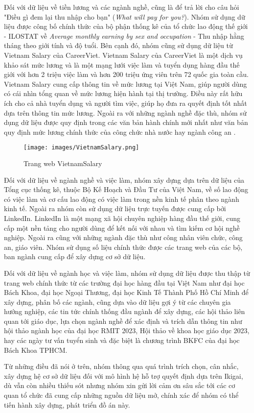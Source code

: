 Đối với dữ liệu về tiền lương và các ngành nghề, cũng là để trả lời cho câu hỏi "Điều gì đem lại thu nhập cho bạn" (\textit{What will pay for you?}). Nhóm sử dụng dữ liệu được công bố chính thức của bộ phận thống kê của tổ chức lao động thế giới - ILOSTAT về \textit{Average monthly earning by sex and occupation} - Thu nhập hằng tháng theo giới tính và độ tuổi. Bên cạnh đó, nhóm cũng sử dụng dữ liệu từ Vietnam Salary của CareerViet. Vietnam Salary của CareerViet là một dịch vụ khảo sát mức lương và là một mạng lưới việc làm và tuyển dụng hàng đầu thế giới với hơn 2 triệu việc làm và hơn 200 triệu ứng viên trên 72 quốc gia toàn cầu. Vietnam Salary cung cấp thông tin về mức lương tại Việt Nam, giúp người dùng có cái nhìn tổng quan về mức lương hiện hành tại thị trường. Điều này rất hữu ích cho cả nhà tuyển dụng và người tìm việc, giúp họ đưa ra quyết định tốt nhất dựa trên thông tin mức lương. Ngoài ra với những ngành nghề đặc thù, nhóm sử dụng dữ liệu được quy định trong các văn bản hành chính mới nhất như văn bản quy định mức lương chính thức của công chức nhà nước hay ngành công an \cite{thuvienphapluat} \cite{tuoitre} \cite{hocmai} \cite{umt} \cite{topcv} \cite{xaydungchinhsach}.

\begin{figure}[H]
    \centering
    \texttt{[image: images/VietnamSalary.png]}
    \vspace{0.6cm}
    \caption{Trang web VietnamSalary}
\end{figure}

Đối với dữ liệu về ngành nghề và việc làm, nhóm xây dựng dựa trên dữ liệu của Tổng cục thống kê, thuộc Bộ Kế Hoạch và Đầu Tư của Việt Nam, về số lao động có việc làm và cơ cấu lao động có việc làm trong nền kinh tế phân theo ngành kinh tế. Ngoài ra nhóm còn sử dụng dữ liệu trực tuyến được cung cấp bởi LinkedIn. LinkedIn là một mạng xã hội chuyên nghiệp hàng đầu thế giới, cung cấp một nền tảng cho người dùng để kết nối với nhau và tìm kiếm cơ hội nghề nghiệp. Ngoài ra cũng với những ngành đặc thù như công nhân viên chức, công an, giáo viên. Nhóm sử dụng số liệu chính thức được các trang web của các bộ, ban ngành cung cấp để xây dựng cơ sở dữ liệu.\cite{xaydungdang} \cite{vietnamnet} \cite{cafef}

Đối với dữ liệu về ngành học và việc làm, nhóm sử dụng dữ liệu được thu thập từ trang web chính thức từ các trường đại học hàng đầu tại Việt Nam như đại học Bách Khoa, đại học Ngoại Thương, đại học Kinh Tế Thành Phố Hồ Chí Minh để xây dựng, phân bố các ngành, cũng dựa vào dữ liệu gợi ý từ các chuyên gia hướng nghiệp, các tin tức chính thống đầu ngành để xây dựng, các hội thảo liên quan tới giáo dục, lựa chọn ngành nghề để xác định và trích dẫn thông tin như hội thảo ngành học của đại học RMIT 2023, Hội thảo về khoa học giáo dục 2023, hay các ngày tư vấn tuyển sinh và đặc biệt là chương trình BKFC của đại học Bách Khoa TPHCM.

Từ những điều đã nói ở trên, nhóm thông qua quá trình trích chọn, cân nhắc, xây dựng hệ cơ sở dữ liệu đối với mô hình hệ hỗ trợ quyết định dựa trên Ikigai, dù vẫn còn nhiều thiếu sót nhưng nhóm xin gửi lời cảm ơn sâu sắc tới các cơ quan tổ chức đã cung cấp những nguồn dữ liệu mở, chính xác để nhóm có thể tiến hành xây dựng, phát triển đồ án này.